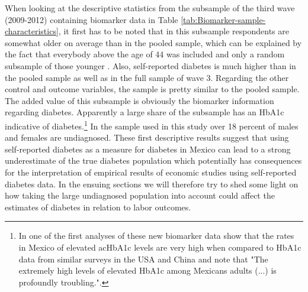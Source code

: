 \documentclass[12pt,english,british]{article}
\begin{document}
When looking at the descriptive statistics from the subsample of the third wave (2009-2012) containing biomarker data in Table \ref{tab:Biomarker-sample-characteristics}, it first has to be noted that in this subsample respondents are somewhat older on average than in the pooled sample, which can be explained by the fact that everybody above the age of 44 was included and only a random subsample of those younger \cite{Crimmins2015}. Also, self-reported diabetes is much higher than in the pooled sample as well as in the full sample of wave 3. Regarding the other control and outcome variables, the sample is pretty similar to the pooled sample. The added value of this subsample is obviously the biomarker information regarding diabetes. Apparently a large share of the subsample has an \ac{HbA1c} indicative of diabetes.\footnote{In one of the first analyses of these new biomarker data \citet{Frankenberg2015} show that the rates in Mexico of elevated ac{HbA1c} levels are very high when compared to \ac{HbA1c} data from similar surveys in the \ac{USA} and China and note that "The extremely high levels of elevated HbA1c among Mexicans adults (...) is profoundly troubling.".} In the sample used in this study over 18 percent of males and females are undiagnosed. These first descriptive results suggest that using self-reported diabetes as a measure for diabetes in Mexico can lead to a strong underestimate of the true diabetes population which potentially has consequences for the interpretation of empirical results of economic studies using self-reported diabetes data. In the ensuing sections we will therefore try to shed some light on how taking the large undiagnosed population into account could affect the estimates of diabetes in relation to labor outcomes. 
\end{document}
